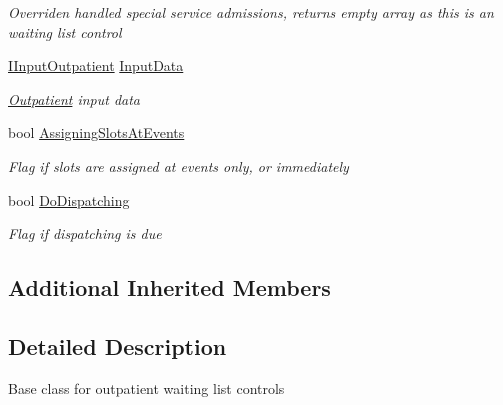 \begin{DoxyCompactItemize}
\begin{DoxyCompactList}\small\item\em Overriden handled special service admissions, returns empty array as this is an waiting list control \end{DoxyCompactList}\item 
\hyperlink{interface_general_health_care_elements_1_1_department_models_1_1_outpatient_1_1_i_input_outpatient}{I\+Input\+Outpatient} \hyperlink{class_general_health_care_elements_1_1_department_models_1_1_outpatient_1_1_waiting_list_1_1_out0eb5e03b9183fdbdabb1cbe4530cecf4_a070eecfc1d919b62fb8ad02bd18fb23c}{Input\+Data}
\begin{DoxyCompactList}\small\item\em \hyperlink{namespace_general_health_care_elements_1_1_department_models_1_1_outpatient}{Outpatient} input data \end{DoxyCompactList}\item 
bool \hyperlink{class_general_health_care_elements_1_1_department_models_1_1_outpatient_1_1_waiting_list_1_1_out0eb5e03b9183fdbdabb1cbe4530cecf4_a7fab7c4858f6cbc22727374789b56811}{Assigning\+Slots\+At\+Events}
\begin{DoxyCompactList}\small\item\em Flag if slots are assigned at events only, or immediately \end{DoxyCompactList}\item 
bool \hyperlink{class_general_health_care_elements_1_1_department_models_1_1_outpatient_1_1_waiting_list_1_1_out0eb5e03b9183fdbdabb1cbe4530cecf4_a3f7df95acb6acc955ec4bbacf74834b0}{Do\+Dispatching}
\begin{DoxyCompactList}\small\item\em Flag if dispatching is due \end{DoxyCompactList}\end{DoxyCompactItemize}
\subsection*{Additional Inherited Members}


\subsection{Detailed Description}
Base class for outpatient waiting list controls 



